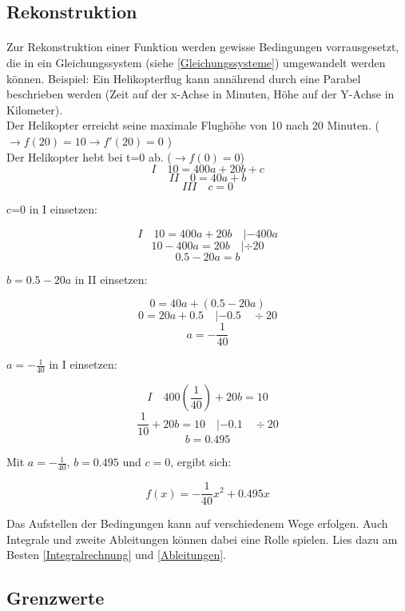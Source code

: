 \documentclass{article}
\begin{document}
	\subsection{Rekonstruktion}\label{Rekonstruktion}
		\paragraph{}
			Zur Rekonstruktion einer Funktion werden gewisse Bedingungen vorrausgesetzt, die in ein Gleichungssystem (siehe \ref{Gleichungssysteme}) umgewandelt werden können.
			Beispiel: Ein Helikopterflug kann annährend durch eine Parabel beschrieben werden (Zeit auf der x-Achse in Minuten, Höhe auf der Y-Achse in Kilometer). \\
			Der Helikopter erreicht seine maximale Flughöhe von 10 nach 20 Minuten. ( $ \rightarrow f(20)=10 \rightarrow f'(20)=0 $ ) \\
			Der Helikopter hebt bei t=0 ab. ($ \rightarrow f(0)=0$) \\
			
			\[ I \quad 10=400a+20b+c \]
			\[ II \quad 0=40a+b \]
			\[ III \quad c=0 \]
			
			c=0 in I einsetzen:
			
			\[I \quad 10=400a+20b \quad |-400a \]
			\[ 10-400a=20b \quad | \div 20\]
			\[ 0.5-20a=b\]
			
			$b= 0.5-20a $ in II einsetzen:
			
			\[ 0=40a+(0.5-20a)\]
			\[ 0=20a+0.5 \quad |-0.5 \quad \div 20\]
			\[ a=-\frac{1}{40} \]
			
			$a=-\frac{1}{40}$ in I einsetzen:
			
			\[ I \quad 400(\frac{1}{40})+20b=10 \]
			\[ \frac{1}{10}+20b=10 \quad |-0.1 \quad \div 20\]
			\[ b=0.495\]
			
			Mit $a=-\frac{1}{40}$, $b=0.495$ und $c=0$, ergibt sich:
			
			\[f(x)=-\frac{1}{40}x^2+0.495x\]
			
			Das Aufstellen der Bedingungen kann auf verschiedenem Wege erfolgen. Auch Integrale und zweite Ableitungen können dabei eine Rolle spielen.
			Lies dazu am Besten \ref{Integralrechnung} und \ref{Ableitungen}.
			

	\subsection{Grenzwerte}
\end{document}
